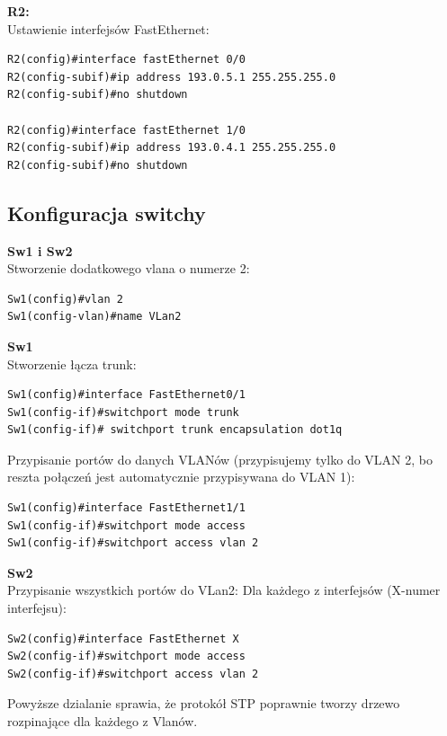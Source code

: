 \documentclass[11pt,a4paper]{article}
\begin{document}
\noindent
{\bf R2:}\\
Ustawienie interfejsów FastEthernet:
\begin{lstlisting}
R2(config)#interface fastEthernet 0/0
R2(config-subif)#ip address 193.0.5.1 255.255.255.0
R2(config-subif)#no shutdown

R2(config)#interface fastEthernet 1/0
R2(config-subif)#ip address 193.0.4.1 255.255.255.0
R2(config-subif)#no shutdown
\end{lstlisting}

\subsection{Konfiguracja switchy}
{\bf Sw1 i Sw2}\\
Stworzenie dodatkowego vlana o numerze 2:
\begin{lstlisting}
Sw1(config)#vlan 2
Sw1(config-vlan)#name VLan2
\end{lstlisting}
\noindent
{\bf Sw1}\\
Stworzenie łącza trunk:
\begin{lstlisting}
Sw1(config)#interface FastEthernet0/1
Sw1(config-if)#switchport mode trunk
Sw1(config-if)# switchport trunk encapsulation dot1q
\end{lstlisting}
Przypisanie portów do danych VLANów (przypisujemy tylko do VLAN 2, bo reszta połączeń jest automatycznie przypisywana do VLAN 1):
\begin{lstlisting}
Sw1(config)#interface FastEthernet1/1
Sw1(config-if)#switchport mode access
Sw1(config-if)#switchport access vlan 2
\end{lstlisting}

\noindent
{\bf Sw2}\\
Przypisanie wszystkich portów do VLan2:
Dla każdego z interfejsów (X-numer interfejsu):
\begin{lstlisting}
Sw2(config)#interface FastEthernet X
Sw2(config-if)#switchport mode access
Sw2(config-if)#switchport access vlan 2
\end{lstlisting}
Powyższe dzialanie sprawia, że protokół STP poprawnie tworzy drzewo rozpinające dla każdego z Vlanów.

\end{document}
